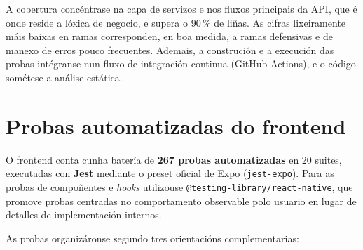 A cobertura concéntrase na capa de servizos e nos fluxos principais da API, que é onde
reside a lóxica de negocio, e supera o 90\,\% de liñas. As cifras lixeiramente máis baixas
en ramas corresponden, en boa medida, a ramas defensivas e de manexo de erros pouco
frecuentes. Ademais, a construción e a execución das probas intégranse nun fluxo de
integración continua (GitHub Actions), e o código sométese a análise estática.

\section{Probas automatizadas do frontend}

O frontend conta cunha batería de \textbf{267 probas automatizadas} en 20 suites, executadas
con \textbf{Jest} mediante o preset oficial de Expo (\texttt{jest-expo}). Para as probas de
compoñentes e \textit{hooks} utilizouse \texttt{@testing-library/react-native}, que promove
probas centradas no comportamento observable polo usuario en lugar de detalles de
implementación internos.

As probas organizáronse segundo tres orientacións complementarias:

